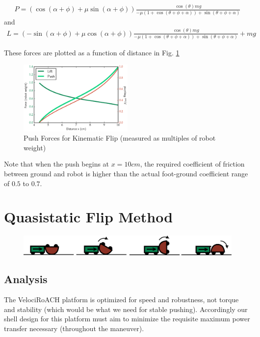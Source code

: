 \documentclass[letterpaper]{report}
\begin{document}
\begin{align}
P = ( \cos(\alpha+\phi) + \mu \sin(\alpha+\phi) ) \frac{\cos(\theta) m g}{-\mu (1+\cos(\theta + \phi + \alpha)) + \sin(\theta + \phi + \alpha)}
\end{align}
and
\begin{align}
L = ( -\sin(\alpha+\phi) + \mu \cos(\alpha+\phi) ) \frac{\cos(\theta) m g}{-\mu (1+\cos(\theta + \phi + \alpha)) + \sin(\theta + \phi + \alpha)} + mg
\end{align}

These forces are plotted as a function of distance in Fig. \ref{fig:KinForces}

\begin{figure}[ht]
\centering
\includegraphics[width=0.5\textwidth]{KinPushForces2.eps}
\caption{\label{fig:KinForces}Push Forces for Kinematic Flip (measured as multiples of robot weight)}
\end{figure}

Note that when the push begins at $x=10 cm$, the required coefficient of friction between ground and robot is higher than the actual foot-ground coefficient range of $0.5$ to $0.7$.

\chapter{Quasistatic Flip Method}

\begin{figure}[ht]
\centering
\includegraphics[width=1.0\textwidth]{QuasiStatic_CoopCartoon.png}
\end{figure}

\section{Analysis}
The VelociRoACH platform is optimized for speed and robustness, not torque and stability (which would be what we need for stable pushing).
Accordingly our shell design for this platform must aim to minimize the requisite maximum power transfer necessary (throughout the maneuver).
\end{document}
